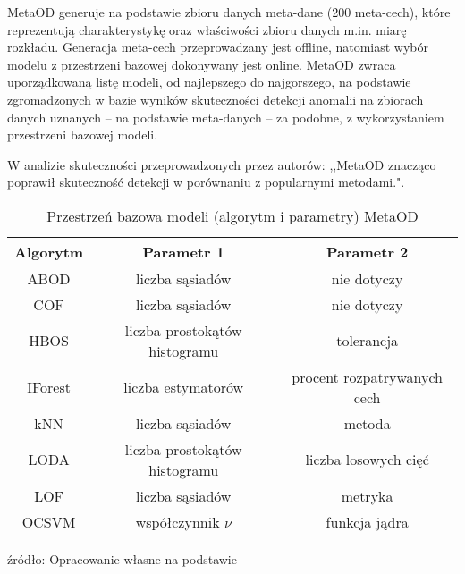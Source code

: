 MetaOD generuje na podstawie zbioru danych meta-dane (200 meta-cech), które reprezentują charakterystykę oraz właściwości zbioru danych m.in. miarę rozkładu. Generacja meta-cech przeprowadzany jest offline, natomiast wybór modelu z przestrzeni bazowej dokonywany jest online. MetaOD zwraca uporządkowaną listę modeli, od najlepszego do najgorszego, na podstawie zgromadzonych w bazie wyników skuteczności detekcji anomalii na zbiorach danych uznanych -- na podstawie meta-danych -- za podobne, z wykorzystaniem przestrzeni bazowej modeli.

W analizie skuteczności przeprowadzonych przez autorów: ,,MetaOD znacząco poprawił skuteczność detekcji w porównaniu z popularnymi metodami."\cite{zhao2020metaod}.



\begin{table}[]
    \centering
    \begin{tabular}{c|c|c}
    Algorytm & Parametr 1 & Parametr 2 \\ \hline
    ABOD     & liczba sąsiadów & nie dotyczy \\
    COF & liczba sąsiadów & nie dotyczy \\
    HBOS & liczba prostokątów histogramu & tolerancja \\
    IForest & liczba estymatorów & procent rozpatrywanych cech \\
    kNN & liczba sąsiadów & metoda \\
    LODA & liczba prostokątów histogramu & liczba losowych cięć \\
    LOF & liczba sąsiadów & metryka \\
    OCSVM &współczynnik $\nu$ & funkcja jądra
    \end{tabular}
    \caption{Przestrzeń bazowa modeli (algorytm i parametry) MetaOD}
        \footnotesize{źródło: Opracowanie własne na podstawie \cite{zhao2020metaod}}
    \label{tab:my_label}
\end{table}